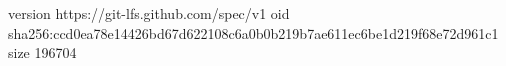 version https://git-lfs.github.com/spec/v1
oid sha256:ccd0ea78e14426bd67d622108c6a0b0b219b7ae611ec6be1d219f68e72d961c1
size 196704
